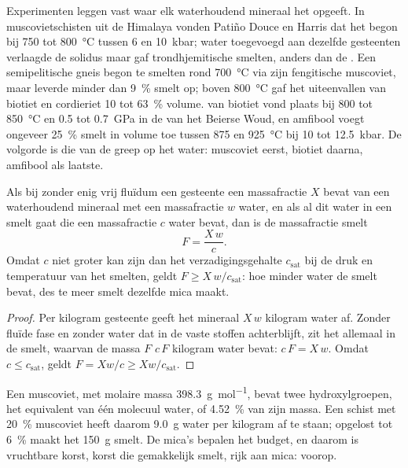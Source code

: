 Experimenten leggen vast waar elk waterhoudend mineraal het opgeeft. In muscovietschisten uit de
Himalaya vonden Patiño Douce en Harris dat het  begon bij 750 tot
\qty{800}{\celsius} tussen 6 en \qty{10}{kbar}; water toegevoegd aan dezelfde gesteenten verlaagde de
solidus maar gaf trondhjemitische smelten, anders dan de . Een semipelitische gneis
begon te smelten rond \qty{700}{\celsius} via zijn fengitische muscoviet, maar leverde minder
dan \qty{9}{\percent} smelt op; boven \qty{800}{\celsius} gaf het uiteenvallen van biotiet en
cordieriet 10 tot \qty{63}{\percent} volume.  van biotiet vond plaats
bij 800 tot \qty{850}{\celsius} en 0.5 tot \qty{0.7}{GPa} in de  van het
Beierse Woud, en amfibool voegt ongeveer \qty{25}{\percent} smelt in volume toe tussen 875
en \qty{925}{\celsius} bij 10 tot \qty{12.5}{kbar}. De volgorde is die van de greep op het water:
muscoviet eerst, biotiet daarna, amfibool als laatste.

\begin{proposition}\label{prop:b2:crustal-melting:water}
Als bij  zonder enig vrij fluïdum een gesteente een massafractie $X$ bevat van een
waterhoudend mineraal met een massafractie $w$ water, en als al dit water in een
smelt gaat die een massafractie $c$ water bevat, dan is de massafractie smelt
\[F = \frac{X\,w}{c}.\]
Omdat $c$ niet groter kan zijn dan het verzadigingsgehalte $c_{\mathrm{sat}}$ bij de druk en
temperatuur van het smelten, geldt $F \ge X\,w/c_{\mathrm{sat}}$: hoe minder water de smelt bevat, des te
meer smelt dezelfde mica maakt.
\end{proposition}

\begin{proof}
Per kilogram gesteente geeft het mineraal $X\,w$ kilogram water af. Zonder fluïde fase
en zonder water dat in de vaste stoffen achterblijft, zit het allemaal in de smelt, waarvan de massa $F$ $c\,F$
kilogram water bevat: $c\,F = X\,w$. Omdat $c \le c_{\mathrm{sat}}$, geldt $F = Xw/c \ge
Xw/c_{\mathrm{sat}}$.
\end{proof}

Een muscoviet,  met molaire massa \qty{398.3}{\gram\per\mole}, bevat twee
hydroxylgroepen, het equivalent van één molecuul water, of \qty{4.52}{\percent} van zijn
massa. Een schist met \qty{20}{\percent} muscoviet heeft daarom \qty{9.0}{\gram} water
per kilogram af te staan; opgelost tot \qty{6}{\percent} maakt het \qty{150}{\gram}
smelt. De mica's bepalen het budget, en daarom is vruchtbare korst, korst die gemakkelijk smelt,
rijk aan mica:  voorop.

